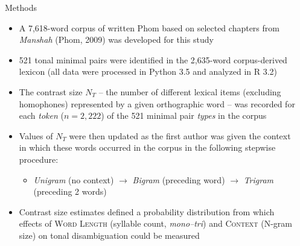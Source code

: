 \documentclass[final]{beamer}
\begin{document}
\begin{frame}[t]
\begin{columns}[t]
\begin{column}{0.85\paperwidth}
\begin{columns}[t,totalwidth=0.85\paperwidth]
\begin{column}{0.4\paperwidth}
\end{column} 

\begin{column}{0.4\paperwidth}
\vspace{-.6in}


\begin{block}{Methods}
  \begin{itemize}
    \item A 7,618-word corpus of written Phom based on selected chapters from \emph{Manshah} {\small (Phom, 2009)} was developed for this study
    \item 521 tonal minimal pairs were identified in the 2,635-word corpus-derived lexicon (all data were processed in Python 3.5 and analyzed in R 3.2)
    \item The contrast size $N_T$ -- the number of different lexical items (excluding homophones) represented by a given orthographic word -- was recorded for each \emph{token} ($n = 2,222$) of the 521 minimal pair \emph{types} in the corpus
    \item Values of $N_T$ were then updated as the first author was given the context in which these words occurred in the corpus in the following stepwise procedure:
    \begin{itemize}
      \item \emph{Unigram} (no context) $\rightarrow$ \emph{Bigram} (preceding word) $\rightarrow$ \emph{Trigram} (preceding 2 words)
    \end{itemize}
    \item Contrast size estimates defined a probability distribution from which effects of \textsc{Word Length} (syllable count, \emph{mono--tri}) and \textsc{Context} (N-gram size) on tonal disambiguation could be measured
  \end{itemize}
\end{block}


\end{column} 


\end{columns} %





\end{column}
\end{columns}
\end{frame}
\end{document}
